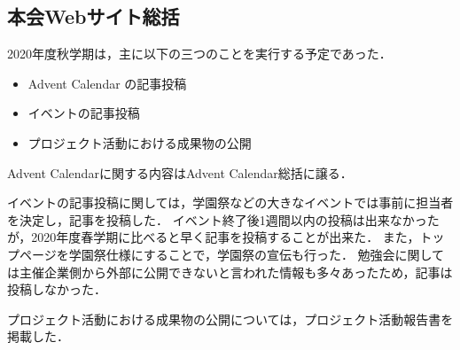 \subsection*{本会Webサイト総括}


2020年度秋学期は，主に以下の三つのことを実行する予定であった．
\begin{itemize}
  \item Advent Calendar の記事投稿
  \item イベントの記事投稿
  \item プロジェクト活動における成果物の公開
\end{itemize}
Advent Calendarに関する内容はAdvent Calendar総括に譲る．\n

イベントの記事投稿に関しては，学園祭などの大きなイベントでは事前に担当者を決定し，記事を投稿した．
イベント終了後1週間以内の投稿は出来なかったが，2020年度春学期に比べると早く記事を投稿することが出来た．
また，トップページを学園祭仕様にすることで，学園祭の宣伝も行った．
勉強会に関しては主催企業側から外部に公開できないと言われた情報も多々あったため，記事は投稿しなかった．\n

プロジェクト活動における成果物の公開については，プロジェクト活動報告書を掲載した．
